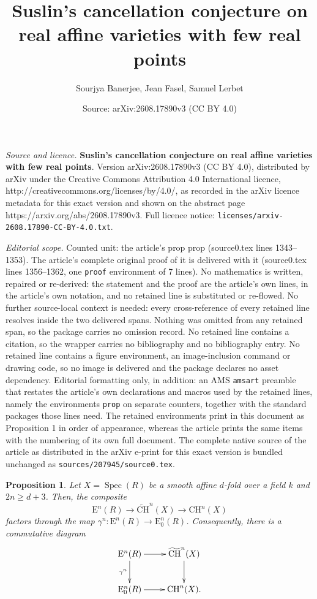 \documentclass[10pt,a4paper]{amsart}
\title{{\bf Suslin's cancellation conjecture on real affine varieties with few real points}}
\author{Sourjya Banerjee, Jean Fasel, Samuel Lerbet}
\date{Source: arXiv:2608.17890v3 (CC BY 4.0)}
\newtheorem{prop}{Proposition}
\newcommand{\CH}{{\mathrm{CH}}}
\newcommand{\CHW}{{\widetilde{\mathrm{CH}}}}
\newcommand{\Er}{\mathrm{E}}
\newcommand{\Spec}{\operatorname{Spec}}
\begin{document}
\maketitle

\noindent\emph{Source and licence.} {\bf Suslin's cancellation conjecture on real affine varieties with few real points}. Version arXiv:2608.17890v3 (CC BY 4.0), distributed by arXiv under the Creative Commons Attribution 4.0 International licence, http://creativecommons.org/licenses/by/4.0/, as recorded in the arXiv licence metadata for this exact version and shown on the abstract page https://arxiv.org/abs/2608.17890v3. Full licence notice: \texttt{licenses/arxiv-2608.17890-CC-BY-4.0.txt}.\par\smallskip

\noindent\textit{Editorial scope.} Counted unit: the article's prop prop (source0.tex lines 1343--1353). The article's complete original proof of it is delivered with it (source0.tex lines 1356--1362, one \texttt{proof} environment of 7 lines). No mathematics is written, repaired or re-derived: the statement and the proof are the article's own lines, in the article's own notation, and no retained line is substituted or re-flowed.  No further source-local context is needed: every cross-reference of every retained line resolves inside the two delivered spans.  Nothing was omitted from any retained span, so the package carries no omission record.  No retained line contains a citation, so the wrapper carries no bibliography and no bibliography entry.  No retained line contains a figure environment, an image-inclusion command or drawing code, so no image is delivered and the package declares no asset dependency.  Editorial formatting only, in addition: an AMS \texttt{amsart} preamble that restates the article's own declarations and macros used by the retained lines, namely the environments \texttt{prop} on separate counters, together with the standard packages those lines need.  The retained environments print in this document as Proposition 1 in order of appearance, whereas the article prints the same items with the numbering of its own full document.  The complete native source of the article as distributed in the arXiv e-print for this exact version is bundled unchanged as \texttt{sources/207945/source0.tex}.
\begin{prop}
  Let $X=\Spec(R)$ be a smooth affine $d$-fold over a field $k$ and $2n\ge d+3$. Then, the composite
\[
\Er^n(R)\to \CHW^{n}(X)\to  \CH^{n}(X)
\]
factors through the map $\gamma^n\colon \Er^n(R)\to \Er^n_0(R)$. Consequently, there is a commutative diagram
\[
\xymatrix{\Er^{n}(R)\ar[r]\ar[d]_-{\gamma^n} & \CHW^{n}(X)\ar[d] \\
\Er_0^{n}(R)\ar[r]& \CH^{n}(X).}
\]
\end{prop}
\end{document}
